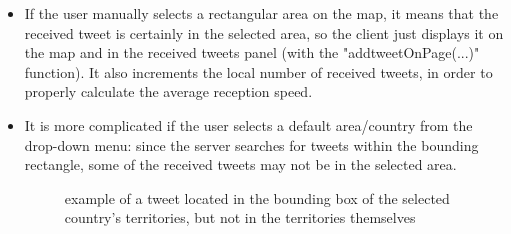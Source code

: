 \documentclass[a4paper,11pt]{report}
\begin{document}
\begin{itemize}
	\item If the user manually selects a rectangular area on the map, it means that the received tweet is certainly in the selected area, so the client just displays it on the map and in the received tweets panel (with the "addtweetOnPage(...)" function). It also increments the local number of received tweets, in order to properly calculate the average reception speed.
	
	\item It is more complicated if the user selects a default area/country from the drop-down menu: since the server searches for tweets within the bounding rectangle, some of the received tweets may not be in the selected area.
	\begin{figure}[H]
	\vspace{-5pt}
	\begin{center}
	\vspace{-5pt}
	\caption{example of a tweet located in the bounding box of the selected country's territories, but not in the territories themselves}
	\end{center}
	\end{figure}
	\vspace{-20pt}
	\newpage


\end{itemize}
\end{document}
